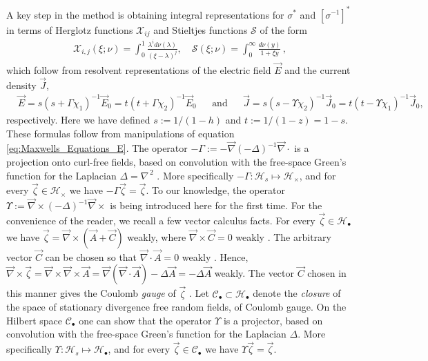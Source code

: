 \documentclass[english,12pt,jmp,graphicx]{revtex4-1}
\begin{document}
A key step in the method is obtaining integral representations for
$\sigma^*$ and $[\sigma^{-1}]^*$ in terms of Herglotz functions
$\mathcal{X}_{ij}$ and Stieltjes functions $\mathcal{S}$ of the
form
%
\begin{align}\label{eq:Integral_Reps}
  \mathcal{X}_{i,j}(\xi;\nu)=\int_0^1\frac{\lambda^id\nu(\lambda)}{(\xi-\lambda)^j}, \quad
  \mathcal{S}(\xi;\nu)=\int_0^\infty\frac{d\nu(y)}{1+\xi y}\,,
\end{align}
%
which follow from resolvent representations
of the electric field $\vec{E}$ and the current density $\vec{J}$,    
%
\begin{align}\label{eq:Resolvent_representations_E_D}
  &\vec{E}=s(s+\Gamma\chi_1)^{-1}\vec{E}_0=t(t+\Gamma\chi_2)^{-1}\vec{E}_0 &&\text{and}
  &&\vec{J}=s(s-\Upsilon\chi_2)^{-1}\vec{J}_0=t(t-\Upsilon\chi_1)^{-1}\vec{J}_0,
\end{align}
%
respectively. Here we have defined $s:=1/(1-h)$ and $t:=1/(1-z)=1-s$. These
formulas follow from manipulations of equation
\eqref{eq:Maxwells_Equations_E}. The operator
$-\Gamma:=-\vec{\nabla}(-\Delta)^{-1}\vec{\nabla}\cdot$ is a projection onto curl-free fields, 
based on convolution with the free-space Green's function for the
Laplacian $\Delta=\nabla^{\,2}$ \cite{Golden:CMP-473}. More specifically
$-\Gamma:\mathscr{H}_s\mapsto\mathscr{H}_\times$, and for every
$\vec{\zeta}\in\mathscr{H}_\times$ we have $-\Gamma\vec{\zeta}=\vec{\zeta}$. To our  
knowledge, the operator $\Upsilon:=\vec{\nabla}\times(-\Delta)^{-1}\vec{\nabla}\times$ is being
introduced here for the first time.
For the convenience of the reader, we recall a few vector calculus
facts. For every $\vec{\zeta}\in\mathscr{H}_\bullet$ we have
$\vec{\zeta}=\vec{\nabla}\times(\vec{A}+\vec{C})$ weakly, where $\vec{\nabla}\times\vec{C}=0$
weakly \cite{Jackson-1999,Folland:95}. The arbitrary vector $\vec{C}$
can be chosen so that $\vec{\nabla}\cdot\vec{A}=0$ weakly
\cite{Jackson-1999}. Hence, $\vec{\nabla}\times\vec{\zeta}=\vec{\nabla}\times\vec{\nabla}\times\vec{A}
=\vec{\nabla}(\vec{\nabla}\cdot\vec{A})-\Delta\vec{A}=-\Delta\vec{A}$ weakly. The vector
$\vec{C}$ chosen in this manner gives the Coulomb
\emph{gauge} of $\vec{\zeta}$ \cite{Jackson-1999}. Let
$\mathscr{C}_{\bullet}\subset\mathscr{H}_{\bullet}$ denote the \emph{closure} of the
space of stationary divergence free random fields, of Coulomb gauge. On
the Hilbert space $\mathscr{C}_{\bullet}$ one can show that the
operator $\Upsilon$ is a projector, based on convolution with the
free-space Green's function for the Laplacian $\Delta$. More specifically
$\Upsilon:\mathscr{H}_s\mapsto\mathscr{H}_\bullet$, and for every $\vec{\zeta}\in\mathscr{C}_\bullet$
we have $\Upsilon\vec{\zeta}=\vec{\zeta}$.  
\end{document}
